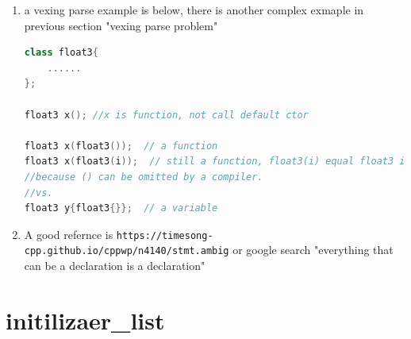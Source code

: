 \documentclass[a4paper,12pt,twoside]{book}
\begin{document}
\begin{enumerate}
	\item a vexing parse example is below, there is another complex exmaple in previous section "vexing parse problem"
\begin{lstlisting}[frame=single, language=c++]
class float3{
	......
};
	
float3 x(); //x is function, not call default ctor
	
float3 x(float3());  // a function
float3 x(float3(i));  // still a function, float3(i) equal float3 i;
//because () can be omitted by a compiler. 
//vs.
float3 y{float3{}};  // a variable
\end{lstlisting}
	
	\item A good refernce is \verb|https://timesong-cpp.github.io/cppwp/n4140/stmt.ambig| or google search 
	"everything that can be a declaration is a declaration" 
\end{enumerate}


\section{initilizaer\_list}
\end{document}

